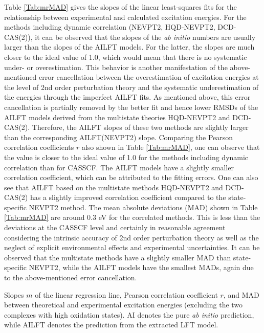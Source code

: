 Table \ref{Tab:mrMAD} gives the slopes of the linear least-squares fits for the relationship between experimental and calculated excitation energies. For the methods including dynamic correlation (NEVPT2, HQD-NEVPT2, DCD-CAS(2)), it can be observed that the slopes of the \textit{ab initio} numbers are usually larger than the slopes of the AILFT models. For the latter, the slopes are much closer to the ideal value of 1.0, which would mean that there is no systematic under- or overestimation. This behavior is another manifestation of the above-mentioned error cancellation between the overestimation of excitation energies at the level of 2nd order perturbation theory and the systematic underestimation of the energies through the imperfect AILFT fits. As mentioned above, this error cancellation is partially removed by the better fit and hence lower RMSDs of the AILFT models derived from the multistate theories HQD-NEVPT2 and DCD-CAS(2). Therefore, the AILFT slopes of these two methods are slightly larger than the corresponding AILFT(NEVPT2) slope. Comparing the Pearson correlation coefficients $r$ also shown in Table \ref{Tab:mrMAD}, one can observe that the value is closer to the ideal value of 1.0 for the methods including dynamic correlation than for CASSCF. The AILFT models have a slightly smaller correlation coefficient, which can be attributed to the fitting errors. One can also see that AILFT based on the multistate methods HQD-NEVPT2 and DCD-CAS(2) has a slightly improved correlation coefficient compared to the state-specific NEVPT2 method. The mean absolute deviations (MAD) shown in Table \ref{Tab:mrMAD} are around 0.3 eV for the correlated methods. This is less than the deviations at the CASSCF level and certainly in reasonable agreement considering the intrinsic accuracy of 2nd order perturbation theory\cite{SchapSN_2013_3567} as well as the neglect of explicit environmental effects and experimental uncertainties. It can be observed that the multistate methods have a slightly smaller MAD than state-specific NEVPT2, while the AILFT models have the smallest MADs, again due to the above-mentioned error cancellation.
\begin{table}
\small
\centering
\ttabbox
{\caption[Slopes $m$ of the linear regression line, Pearson correlation coefficient $r$, and MAD between theoretical and experimental excitation energies.]{Slopes $m$ of the linear regression line, Pearson correlation coefficient $r$, and MAD between theoretical and experimental excitation energies (excluding the two complexes with high oxidation states). AI denotes the pure \textit{ab initio} prediction, while AILFT denotes the prediction from the extracted LFT model.}
\label{Tab:mrMAD}}
{}
\end{table}

